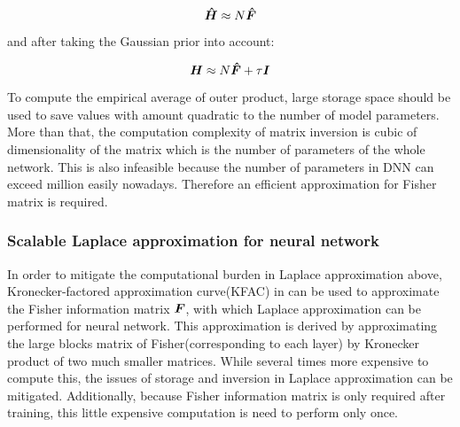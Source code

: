 \begin{equation} \label{fisher hessian}
\boldsymbol{\hat{H}} \approx N\boldsymbol{\hat{F}}
\end{equation}

and after taking the Gaussian prior into account:

\begin{equation} \label{fisher hessian_with_prior}
\boldsymbol H \approx N\boldsymbol{\hat F} + \tau \mathcal {\boldsymbol I}
\end{equation}

To compute the empirical average of outer product, large storage space should be used to save values with amount quadratic to the number of model parameters. More than that, the computation complexity of matrix inversion is cubic of dimensionality of the matrix which is the number of parameters of the whole network. This is also infeasible because the number of parameters in DNN can exceed million easily nowadays. Therefore an efficient approximation for Fisher matrix is required. 


\subsubsection{Scalable Laplace approximation for neural network}
In order to mitigate the computational burden in Laplace approximation above, Kronecker-factored approximation curve(KFAC) in \cite{martens2015optimizing} can be used to approximate the Fisher information matrix $\boldsymbol F$, with which Laplace approximation can be performed for neural network\cite{ritter2018scalable}. This approximation is derived by approximating the large blocks matrix of Fisher(corresponding to each layer) by Kronecker product of two much smaller matrices. While several times more expensive to compute this, the issues of storage and inversion in Laplace approximation can be mitigated. Additionally, because Fisher information matrix is only required after training, this little expensive computation is need to perform only once.

